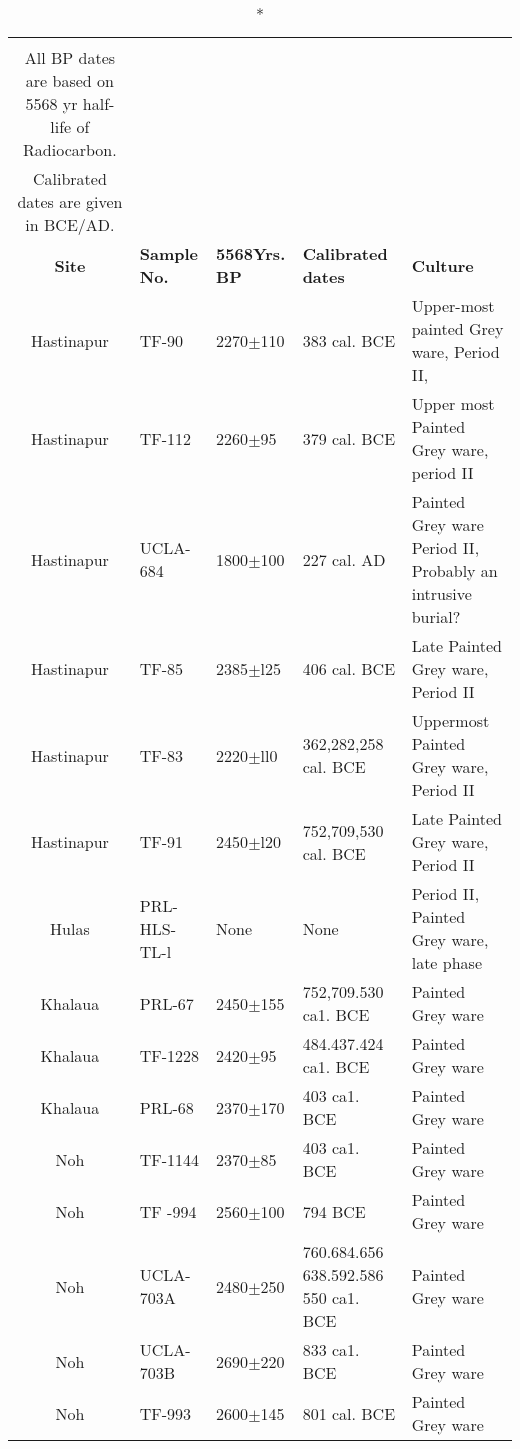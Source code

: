 {\setlength\tabcolsep{2pt}
{\fontsize{7}{9}\selectfont
\begin{longtable}{|c|p{1.4cm}|p{1cm}|p{1.5cm}|p{3cm}|}
\caption*{Table III.5: PGW SITES\\[10pt] 
All BP dates are based on 5568 yr half-life of Radiocarbon.\\ 
Calibrated dates are given in BCE/AD.}\label{table III.5}\\
\hline
\multicolumn{1}{|m{1cm}|}{\centering \textbf{Site}} &\multicolumn{1}{m{1.4cm}|}{\centering \textbf{Sample No.}}&\multicolumn{1}{m{1cm}|}{\centering \textbf{5568Yrs. BP}}& \multicolumn{1}{m{1.5cm}|}{\centering \textbf{Calibrated dates}}& \multicolumn{1}{m{3cm}|}{\centering \textbf{Culture}}\\
\endfirsthead
\hline
\endhead
\hline
\endfoot
\hline
Hastinapur & TF-90 & 2270$\pm$110 & 383 cal. BCE & Upper-most painted Grey ware, Period II, \\
Hastinapur & TF-112 & 2260$\pm$95 & 379 cal. BCE & Upper most Painted Grey ware, period II\\
Hastinapur & UCLA-684 &1800$\pm$100 & 227 cal. AD & Painted Grey ware Period II, Probably an intrusive burial?\\
Hastinapur & TF-85 & 2385$\pm$l25 & 406 cal. BCE & Late Painted Grey ware, Period II\\
Hastinapur & TF-83 & 2220$\pm$ll0 & 362,282,258 cal. BCE & Uppermost Painted Grey ware, Period II\\
Hastinapur & TF-91 & 2450$\pm$l20 & 752,709,530 cal. BCE & Late Painted Grey ware, Period II\\
Hulas & PRL-HLS-TL-l & None & None &  Period II, Painted Grey ware, late phase\\
Khalaua & PRL-67 & 2450$\pm$155 & 752,709.530 ca1. BCE & Painted Grey ware\\
Khalaua & TF-1228 & 2420$\pm$95 & 484.437.424 ca1. BCE & Painted Grey ware\\
Khalaua & PRL-68 & 2370$\pm$170 & 403 ca1. BCE & Painted Grey ware\\
Noh & TF-1144 & 2370$\pm$85 & 403 ca1. BCE & Painted Grey ware\\
Noh & TF -994 & 2560$\pm$100 & 794 BCE & Painted Grey ware\\
Noh & UCLA- 703A & 2480$\pm$250 & 760.684.656 638.592.586 550 ca1. BCE & Painted Grey ware\\
Noh & UCLA-703B & 2690$\pm$220 & 833 ca1. BCE &Painted Grey ware\\
Noh & TF-993 & 2600$\pm$145 & 801 cal. BCE &Painted Grey ware\\

\end{longtable}}}
